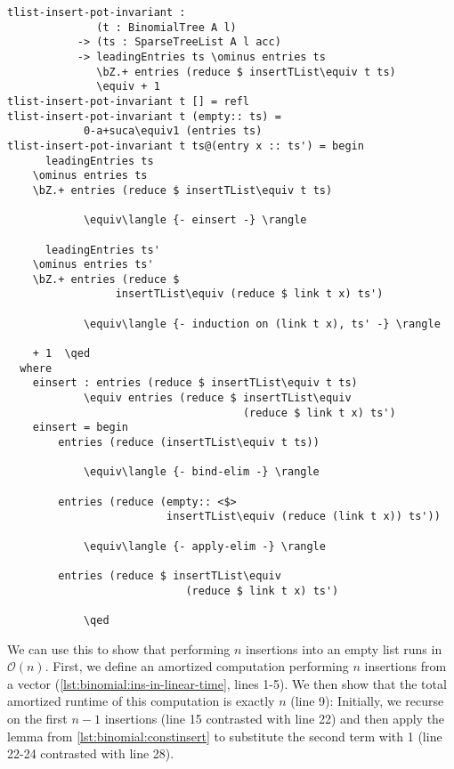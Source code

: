 \begin{lstlisting}[caption={Insertion runs in constant time},label={lst:binomial:constinsert},emph={tlist,insert,pot,invariant,empty,entry,BinomialTree,SparseTreeList,leadingEntries,entries,insertTList}]
tlist-insert-pot-invariant :
              (t : BinomialTree A l)
           -> (ts : SparseTreeList A l acc)
           -> leadingEntries ts \ominus entries ts
              \bZ.+ entries (reduce $ insertTList\equiv t ts)
              \equiv + 1
tlist-insert-pot-invariant t [] = refl
tlist-insert-pot-invariant t (empty:: ts) =
            0-a+suca\equiv1 (entries ts)
tlist-insert-pot-invariant t ts@(entry x :: ts') = begin
      leadingEntries ts
    \ominus entries ts
    \bZ.+ entries (reduce $ insertTList\equiv t ts)

            \equiv\langle {- einsert -} \rangle

      leadingEntries ts'
    \ominus entries ts'
    \bZ.+ entries (reduce $
                 insertTList\equiv (reduce $ link t x) ts')

            \equiv\langle {- induction on (link t x), ts' -} \rangle

    + 1  \qed
  where
    einsert : entries (reduce $ insertTList\equiv t ts)
            \equiv entries (reduce $ insertTList\equiv
                                     (reduce $ link t x) ts')
    einsert = begin
        entries (reduce (insertTList\equiv t ts))

            \equiv\langle {- bind-elim -} \rangle

        entries (reduce (empty:: <$>
                         insertTList\equiv (reduce (link t x)) ts'))

            \equiv\langle {- apply-elim -} \rangle

        entries (reduce $ insertTList\equiv
                            (reduce $ link t x) ts')

            \qed

\end{lstlisting}

We can use this to show that performing $n$ insertions into an empty list runs in $\mathcal O(n)$. First, we define an amortized computation performing $n$ insertions from a vector (\autoref{lst:binomial:ins-in-linear-time}, lines 1-5). We then show that the total amortized runtime of this computation is exactly $n$ (line 9): Initially, we recurse on the first $n-1$ insertions (line 15 contrasted with line 22) and then apply the lemma from \autoref{lst:binomial:constinsert} to substitute the second term with 1 (line 22-24 contrasted with line 28).

